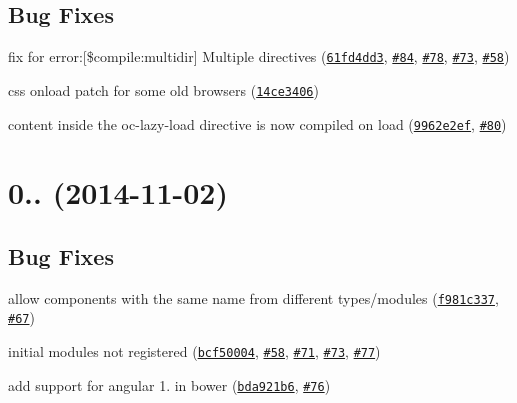 \subsection*{Bug Fixes}


\begin{DoxyItemize}
\item fix for error\+:\mbox{[}\$compile\+:multidir\mbox{]} Multiple directives (\href{https://github.com/ocombe/ocLazyLoad/commit/61fd4dd3b8131245d33eb2314dcf37a9188a6728}{\tt 61fd4dd3}, \href{https://github.com/ocombe/ocLazyLoad/issues/84}{\tt \#84}, \href{https://github.com/ocombe/ocLazyLoad/issues/78}{\tt \#78}, \href{https://github.com/ocombe/ocLazyLoad/issues/73}{\tt \#73}, \href{https://github.com/ocombe/ocLazyLoad/issues/58}{\tt \#58})
\item css onload patch for some old browsers (\href{https://github.com/ocombe/ocLazyLoad/commit/14ce34066e0e865c8fa86f663d38e046f7a32abb}{\tt 14ce3406})
\item content inside the oc-\/lazy-\/load directive is now compiled on load (\href{https://github.com/ocombe/ocLazyLoad/commit/9962e2ef163e9449e295dd3297f6019267a0e0e1}{\tt 9962e2ef}, \href{https://github.com/ocombe/ocLazyLoad/issues/80}{\tt \#80})
\end{DoxyItemize}

\label{_0.3.9}%
 \section*{0.. (2014-\/11-\/02)}

\subsection*{Bug Fixes}


\begin{DoxyItemize}
\item allow components with the same name from different types/modules (\href{https://github.com/ocombe/ocLazyLoad/commit/f981c33749e4e61fa4dfd7c3c41df9beffcbf734}{\tt f981c337}, \href{https://github.com/ocombe/ocLazyLoad/issues/67}{\tt \#67})
\item initial modules not registered (\href{https://github.com/ocombe/ocLazyLoad/commit/bcf50004b8a1172aff4c769746fdcb9e5d5d9cba}{\tt bcf50004}, \href{https://github.com/ocombe/ocLazyLoad/issues/58}{\tt \#58}, \href{https://github.com/ocombe/ocLazyLoad/issues/71}{\tt \#71}, \href{https://github.com/ocombe/ocLazyLoad/issues/73}{\tt \#73}, \href{https://github.com/ocombe/ocLazyLoad/issues/77}{\tt \#77})
\item add support for angular 1. in bower (\href{https://github.com/ocombe/ocLazyLoad/commit/bda921b68ce30645d992982325adc4eebfdcd361}{\tt bda921b6}, \href{https://github.com/ocombe/ocLazyLoad/issues/76}{\tt \#76})
\end{DoxyItemize}

